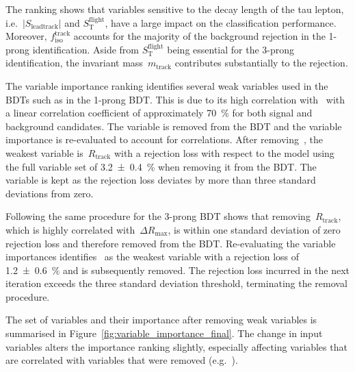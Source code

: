 The ranking shows that variables sensitive to the decay length of the tau
lepton, i.e.\ $|S_\text{leadtrack}|$ and $S_\text{T}^\text{flight}$, have a
large impact on the classification performance. Moreover,
$f_\text{iso}^\text{track}$ accounts for the majority of the background
rejection in the 1-prong identification. Aside from $S_\text{T}^\text{flight}$
being essential for the 3-prong identification, the invariant
mass~$m_\text{track}$ contributes substantially to the rejection.

The variable importance ranking identifies several weak variables used in the
BDTs such as  in the 1-prong BDT. This is
due to its high correlation
with~ with a linear correlation
coefficient of approximately \SI{70}{\percent} for both signal and background
\tauhadvis candidates. The variable is removed from the BDT and the variable
importance is re-evaluated to account for correlations. After
removing~, the weakest variable
is~$R_\text{track}$ with a rejection loss with respect to the model using the
full variable set of \SI{3.2 +- 0.4}{\percent} when removing it from the BDT.
The variable is kept as the rejection loss deviates by more than three standard
deviations from zero.

Following the same procedure for the 3-prong BDT shows that
removing~$R_\text{track}$, which is highly correlated
with~$\Delta R_\text{max}$, is within one standard deviation of zero rejection
loss and therefore removed from the BDT. Re-evaluating the variable importances
identifies~ as the weakest variable with a
rejection loss of \SI{1.2 +- 0.6}{\percent} and is subsequently removed. The
rejection loss incurred in the next iteration exceeds the three standard
deviation threshold, terminating the removal procedure.

The set of variables and their importance after removing weak variables is
summarised in Figure~\ref{fig:variable_importance_final}. The change in input
variables alters the importance ranking slightly, especially affecting variables
that are correlated with variables that were removed (e.g.\
).


